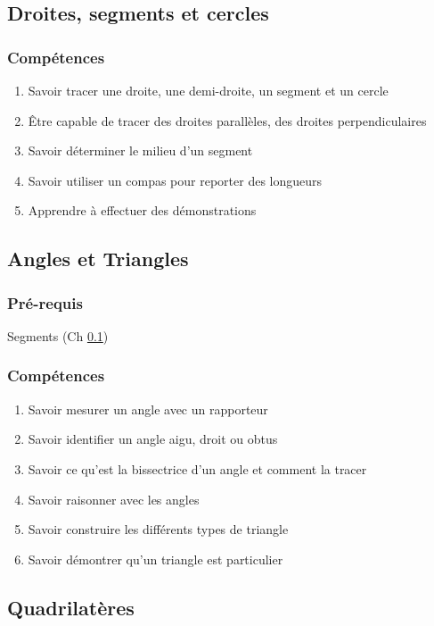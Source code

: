 \subsection{Droites, segments et cercles}\label{ch_6_droites}

\subsubsection*{Compétences}
\begin{enumerate}
	\item Savoir tracer une droite, une demi-droite, un segment et un cercle
	\item Être capable de tracer des droites parallèles, des droites perpendiculaires
	\item Savoir déterminer le milieu d'un segment
	\item Savoir utiliser un compas pour reporter des longueurs
	\item Apprendre à effectuer des démonstrations
\end{enumerate}

\subsection{Angles et Triangles}\label{ch_6_angles}

\subsubsection*{Pré-requis}
Segments (Ch \ref{ch_6_droites})

\subsubsection*{Compétences}

\begin{enumerate}
	\item Savoir mesurer un angle avec un rapporteur
	\item Savoir identifier un angle aigu, droit ou obtus
	\item Savoir ce qu'est la bissectrice d'un angle et comment la tracer
	\item Savoir raisonner avec les angles
	\item Savoir construire les différents types de triangle
	\item Savoir démontrer qu'un triangle est particulier
\end{enumerate}

\subsection{Quadrilatères}\label{ch_6_quad}

